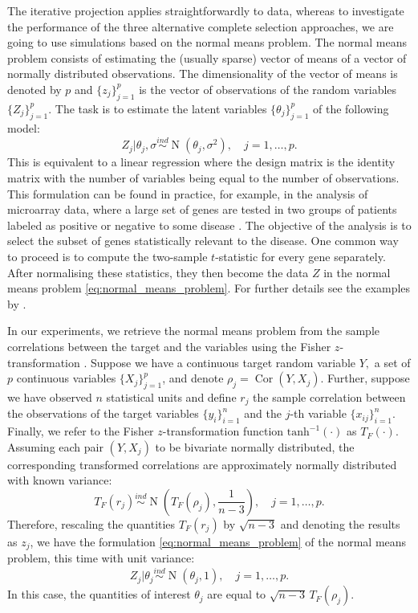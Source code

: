 \documentclass[a4]{article}
\theoremstyle{definition}
\DeclareMathOperator{\Cor}{Cor}
\DeclareMathOperator{\N}{N}
\begin{document}
The iterative projection applies straightforwardly to data, whereas
to investigate the performance of the three alternative complete selection approaches,
we are going to use simulations based on the normal means problem.
The normal means problem consists of estimating the (usually
sparse) vector of means of a vector of normally distributed
observations. The dimensionality of the vector of means is denoted by
$p$ and $\{z_{j}\}_{j=1}^{p}$ is the vector of observations of the
random variables $\{Z_{j}\}_{j=1}^{p}$. The task is to estimate the
latent variables $\{\theta_{j}\}_{j=1}^{p}$ of the following model: \
\begin{equation}\label{eq:normal_means_problem}
Z_{j}|\theta_{j},\sigma\overset{ind}{\sim}\N(\theta_{j},\sigma^{2}), \quad j=1,\ldots,p.
\end{equation}
This is equivalent to a linear regression where the design matrix is
the identity matrix with the number of variables being equal to the
number of observations. This formulation can be found in practice, for
example, in the analysis of microarray data, where a large set of
genes are tested in two groups of patients labeled as positive or
negative to some disease \citep{paper:efron,efron2012large}. The
objective of the analysis is to select the subset of genes
statistically relevant to the disease. One common way to proceed is to
compute the two-sample $t$-statistic for every gene separately.  After
normalising these statistics, they then become the data $Z$ in the
normal means problem \eqref{eq:normal_means_problem}. For further
details see the examples by \cite{paper:efron, efron2012large}.

In our experiments, we retrieve the normal means problem from the
sample correlations between the target and the variables using the
Fisher $z$-transformation \citep{hawkins1989using}. Suppose we have a
continuous target random variable $Y,$ a set of $p$ continuous
variables $\{X_{j}\}_{j=1}^{p}$, and denote
$\rho_{j}=\Cor(Y,X_{j})$. Further, suppose we have observed $n$
statistical units and define $r_{j}$ the sample correlation between
the observations of the target variables $\{y_{i}\}_{i=1}^{n}$ and the
$j$-th variable $\{x_{ij}\}_{i=1}^{n}$. Finally, we refer to the
Fisher $z$-transformation function $\text{tanh}^{-1}(\cdot)$ as
$T_{F}(\cdot)$. Assuming each pair $(Y,X_{j})$ to be bivariate
normally distributed, the corresponding transformed correlations are
approximately normally distributed with known variance: \
\begin{equation} \label{eq:fisher_transformation}
T_{F}(r_{j})\overset{ind}{\sim} \N\left(T_{F}(\rho_{j}),\frac{1}{n-3}\right), \quad j=1,\ldots,p.
\end{equation}
Therefore, rescaling the quantities $T_{F}(r_{j})$ by $\sqrt{n-3}$ and
denoting the results as $z_{j}$, we have the formulation
\eqref{eq:normal_means_problem} of the normal means problem, this time
with unit variance: \
\begin{equation} \label{eq:normal_means_problem2}
Z_{j}|\theta_{j}\overset{ind}{\sim}\N(\theta_{j},1), \quad j=1,\ldots,p.
\end{equation}
In this case, the quantities of interest $\theta_{j}$ are equal to
$\sqrt{n-3}\,T_{F}(\rho_{j})$.
\end{document}
